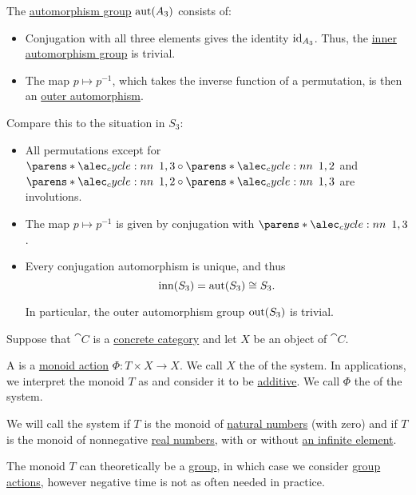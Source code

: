\begin{example}
  The \hyperref[def:automorphism_group]{automorphism group} \( \operatorname{aut}(A_3) \) consists of:
  \begin{itemize}
    \item Conjugation with all three elements gives the identity \( \operatorname{id}_{A_3} \). Thus, the \hyperref[def:inner_and_outer_automorphisms]{inner automorphism group} is trivial.

    \item The map \( p \mapsto p^{-1} \), which takes the inverse function of a permutation, is then an \hyperref[def:inner_and_outer_automorphisms]{outer automorphism}.
  \end{itemize}

  Compare this to the situation in \( S_3 \):
  \begin{itemize}
    \item All permutations except for \( \cycle{ 1, 3 } \bincirc \cycle{ 1, 2 } \) and \( \cycle{ 1, 2 } \bincirc \cycle{ 1, 3 } \) are involutions.
    \item The map \( p \mapsto p^{-1} \) is given by conjugation with \( \cycle{ 1, 3 } \).
    \item Every conjugation automorphism is unique, and thus
    \begin{equation*}
      \operatorname{inn}(S_3) = \operatorname{aut}(S_3) \cong S_3.
    \end{equation*}

    In particular, the outer automorphism group \( \operatorname{out}(S_3) \) is trivial.
  \end{itemize}
\end{example}

\begin{definition}\label{def:dynamical_system}\mimprovised
  Suppose that \( \cat{C} \) is a \hyperref[def:concrete_category]{concrete category} and let \( X \) be an object of \( \cat{C} \).

  A  is a \hyperref[def:monoid_action]{monoid action} \( \Phi: T \times X \to X \). We call \( X \) the  of the system. In applications, we interpret the monoid \( T \) as  and consider it to be \hyperref[rem:additive_magma]{additive}. We call \( \Phi \) the  of the system.

  We will call the system  if \( T \) is the monoid of \hyperref[def:set_of_natural_numbers]{natural numbers} (with zero) and  if \( T \) is the monoid of nonnegative \hyperref[def:set_of_real_numbers]{real numbers}, with or without \hyperref[def:extended_real_numbers]{an infinite element}.

  The monoid \( T \) can theoretically be a \hyperref[def:group]{group}, in which case we consider \hyperref[def:group_action]{group actions}, however negative time is not as often needed in practice.
\end{definition}

